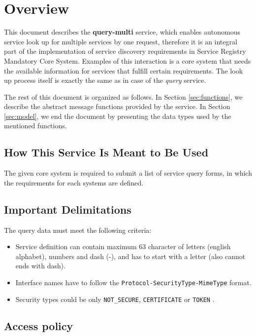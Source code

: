 \documentclass[a4paper]{arrowhead}
\begin{document}
\section{Overview}
\label{sec:overview}
This document describes the \textbf{query-multi} service, which enables autonomous service look up for multiple services by one request, therefore it is an integral part of the implementation of service discovery requirements in Service Registry Mandatory Core System. Examples of this interaction is a core system that needs the available information for services that fulfill certain requirements. The look up process itself is exactly the same as in case of the \textit{query} service.

The rest of this document is organized as follows.
In Section \ref{sec:functions}, we describe the abstract message functions provided by the service.
In Section \ref{sec:model}, we end the document by presenting the data types used by the mentioned functions.

\newpage

\subsection{How This Service Is Meant to Be Used}
The given core system is required to submit a list of service query forms, in which the requirements for each systems are defined.
\subsection{Important Delimitations}
\label{sec:delimitations}

The query data must meet the following criteria:

\begin{itemize}
    \item Service definition can contain maximum 63 character of letters (english alphabet), numbers and dash (-), and has to start with a letter (also cannot ends with dash).
    \item Interface names have to follow the \texttt{Protocol-SecurityType-MimeType} format.
    \item Security types could be only \texttt{NOT\_SECURE}, \texttt{CERTIFICATE} or \texttt{TOKEN} .
\end{itemize}

\subsection{Access policy}
\label{sec:accesspolicy}
\end{document}

